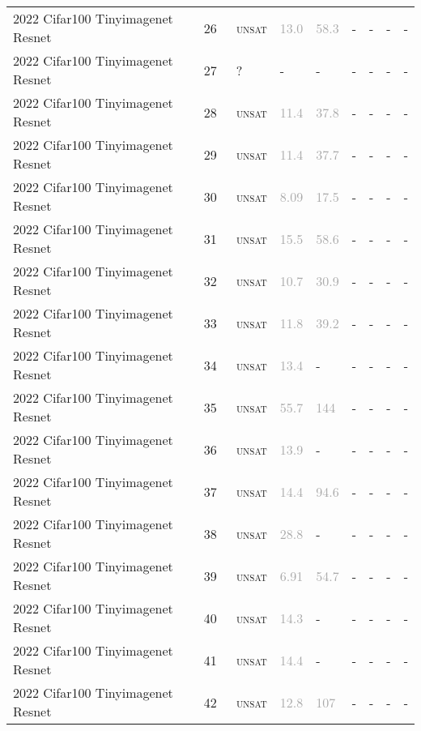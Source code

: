 \begin{center}
{\begin{longtable}{@{}lllllllll@{}}
2022 Cifar100 Tinyimagenet Resnet & 26 & ~\textsc{unsat} & \textcolor{darkgray}{13.0} & \textcolor{darkgray}{58.3} & - & - & - & - \\
2022 Cifar100 Tinyimagenet Resnet & 27 & ~? & - & - & - & - & - & - \\
2022 Cifar100 Tinyimagenet Resnet & 28 & ~\textsc{unsat} & \textcolor{darkgray}{11.4} & \textcolor{darkgray}{37.8} & - & - & - & - \\
2022 Cifar100 Tinyimagenet Resnet & 29 & ~\textsc{unsat} & \textcolor{darkgray}{11.4} & \textcolor{darkgray}{37.7} & - & - & - & - \\
2022 Cifar100 Tinyimagenet Resnet & 30 & ~\textsc{unsat} & \textcolor{darkgray}{8.09} & \textcolor{darkgray}{17.5} & - & - & - & - \\
2022 Cifar100 Tinyimagenet Resnet & 31 & ~\textsc{unsat} & \textcolor{darkgray}{15.5} & \textcolor{darkgray}{58.6} & - & - & - & - \\
2022 Cifar100 Tinyimagenet Resnet & 32 & ~\textsc{unsat} & \textcolor{darkgray}{10.7} & \textcolor{darkgray}{30.9} & - & - & - & - \\
2022 Cifar100 Tinyimagenet Resnet & 33 & ~\textsc{unsat} & \textcolor{darkgray}{11.8} & \textcolor{darkgray}{39.2} & - & - & - & - \\
2022 Cifar100 Tinyimagenet Resnet & 34 & ~\textsc{unsat} & \textcolor{darkgray}{13.4} & - & - & - & - & - \\
2022 Cifar100 Tinyimagenet Resnet & 35 & ~\textsc{unsat} & \textcolor{darkgray}{55.7} & \textcolor{darkgray}{144} & - & - & - & - \\
2022 Cifar100 Tinyimagenet Resnet & 36 & ~\textsc{unsat} & \textcolor{darkgray}{13.9} & - & - & - & - & - \\
2022 Cifar100 Tinyimagenet Resnet & 37 & ~\textsc{unsat} & \textcolor{darkgray}{14.4} & \textcolor{darkgray}{94.6} & - & - & - & - \\
2022 Cifar100 Tinyimagenet Resnet & 38 & ~\textsc{unsat} & \textcolor{darkgray}{28.8} & - & - & - & - & - \\
2022 Cifar100 Tinyimagenet Resnet & 39 & ~\textsc{unsat} & \textcolor{darkgray}{6.91} & \textcolor{darkgray}{54.7} & - & - & - & - \\
2022 Cifar100 Tinyimagenet Resnet & 40 & ~\textsc{unsat} & \textcolor{darkgray}{14.3} & - & - & - & - & - \\
2022 Cifar100 Tinyimagenet Resnet & 41 & ~\textsc{unsat} & \textcolor{darkgray}{14.4} & - & - & - & - & - \\
2022 Cifar100 Tinyimagenet Resnet & 42 & ~\textsc{unsat} & \textcolor{darkgray}{12.8} & \textcolor{darkgray}{107} & - & - & - & - \\

\end{longtable}}
\end{center}
